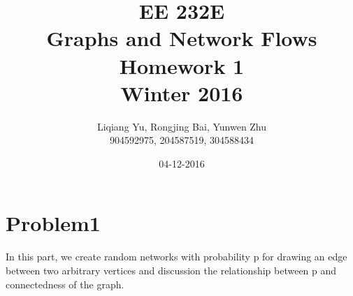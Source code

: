 \documentclass{article}
\begin{document}
\begin{titlepage}
\title{EE 232E \\Graphs and Network Flows\\Homework 1\\Winter 2016} 
\author{Liqiang Yu, Rongjing Bai, Yunwen Zhu\\
904592975, 204587519, 304588434}  %
\date{04-12-2016}
\end{titlepage}

\maketitle
\newpage
\tableofcontents
\newpage

\section{Problem1}\label{prob:p1}
In this part, we create random networks with probability p for drawing an edge between two arbitrary vertices and discussion the relationship between p and connectedness of the graph.
\end{document}
